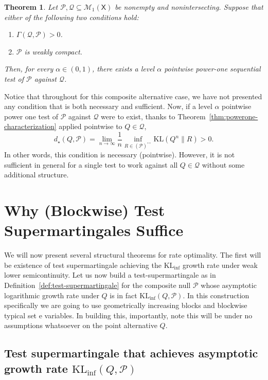 \documentclass[11pt]{article}
\newcommand{\KL}{\mathrm{KL}}
\newcommand{\KLinf}{\mathrm{KL}_{\mathrm{inf}}}
\newcommand{\Pcal}{\mathcal{P}}
\newcommand{\Qcal}{\mathcal{Q}}
\newcommand{\X}{\mathsf{X}}
\newtheorem{theorem}{Theorem}[section]
\theoremstyle{definition}
\theoremstyle{definition}
\begin{document}
\begin{theorem}\label{thm:two-sufficient-powerone}
Let $\Pcal,\Qcal\subseteq\mathcal M_1(\X)$ be nonempty and nonintersecting. Suppose that either of the following two conditions hold:
\begin{enumerate}
    \item $\Gamma(\Qcal,\Pcal)>0$.
    \item $\Pcal$ is weakly compact.
\end{enumerate}
Then, for every $\alpha\in(0,1)$, there exists a level $\alpha$ pointwise power-one sequential test of $\Pcal$ against $\Qcal$.
\end{theorem}

Notice that throughout for this composite alternative case, we have not presented any condition that is both necessary and sufficient. Now, if a level $\alpha$ pointwise power one test of $\Pcal$ against $\Qcal$ were to exist, thanks to Theorem~\ref{thm:powerone-characterization} applied pointwise to $Q\in\Qcal$,
\[
d_\star(Q,\Pcal)=\lim_{n\to\infty}\frac1n\inf_{R\in(\Pcal)^{\circ\circ}}\KL(Q^n\|R)>0.
\]
In other words, this condition is necessary (pointwise). However, it is not sufficient in general for a single test to work against all $Q\in\Qcal$ without some additional structure.


\section{Why (Blockwise) Test Supermartingales Suffice}\label{sec:super}

We will now present several structural theorems for rate optimality. The first will be existence of test supermartingale achieving the $\KLinf$ growth rate under weak lower semicontinuity. Let us now build a test-supermartingale as in Definition~\ref{def:test-supermartingale} for the composite null $\Pcal$ whose asymptotic logarithmic growth rate under $Q$ is in fact $\KLinf(Q,\Pcal)$. In this construction specifically we are going to use geometrically increasing blocks and blockwise typical set e variables. In building this, importantly, note this will be under no assumptions whatsoever on the point alternative $Q$.

\subsection{Test supermartingale that achieves asymptotic growth rate $\KLinf(Q,\Pcal)$}
\end{document}
